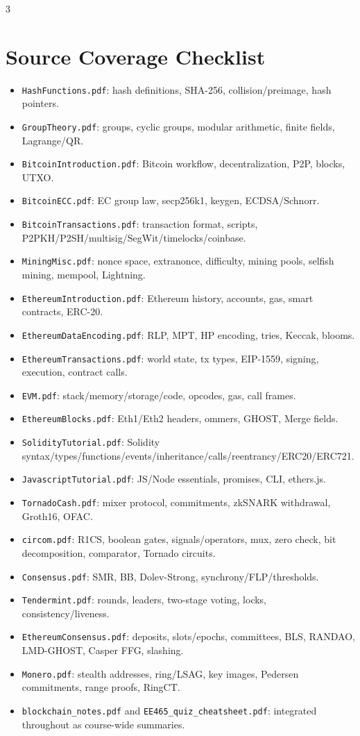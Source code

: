 \documentclass[8pt]{extarticle}
\begin{document}
\begin{multicols*}{3}
\section{Source Coverage Checklist}
\begin{itemize}
\item \texttt{HashFunctions.pdf}: hash definitions, SHA-256, collision/preimage, hash pointers.
\item \texttt{GroupTheory.pdf}: groups, cyclic groups, modular arithmetic, finite fields, Lagrange/QR.
\item \texttt{BitcoinIntroduction.pdf}: Bitcoin workflow, decentralization, P2P, blocks, UTXO.
\item \texttt{BitcoinECC.pdf}: EC group law, secp256k1, keygen, ECDSA/Schnorr.
\item \texttt{BitcoinTransactions.pdf}: transaction format, scripts, P2PKH/P2SH/multisig/SegWit/timelocks/coinbase.
\item \texttt{MiningMisc.pdf}: nonce space, extranonce, difficulty, mining pools, selfish mining, mempool, Lightning.
\item \texttt{EthereumIntroduction.pdf}: Ethereum history, accounts, gas, smart contracts, ERC-20.
\item \texttt{EthereumDataEncoding.pdf}: RLP, MPT, HP encoding, tries, Keccak, blooms.
\item \texttt{EthereumTransactions.pdf}: world state, tx types, EIP-1559, signing, execution, contract calls.
\item \texttt{EVM.pdf}: stack/memory/storage/code, opcodes, gas, call frames.
\item \texttt{EthereumBlocks.pdf}: Eth1/Eth2 headers, ommers, GHOST, Merge fields.
\item \texttt{SolidityTutorial.pdf}: Solidity syntax/types/functions/events/inheritance/calls/reentrancy/ERC20/ERC721.
\item \texttt{JavascriptTutorial.pdf}: JS/Node essentials, promises, CLI, ethers.js.
\item \texttt{TornadoCash.pdf}: mixer protocol, commitments, zkSNARK withdrawal, Groth16, OFAC.
\item \texttt{circom.pdf}: R1CS, boolean gates, signals/operators, mux, zero check, bit decomposition, comparator, Tornado circuits.
\item \texttt{Consensus.pdf}: SMR, BB, Dolev-Strong, synchrony/FLP/thresholds.
\item \texttt{Tendermint.pdf}: rounds, leaders, two-stage voting, locks, consistency/liveness.
\item \texttt{EthereumConsensus.pdf}: deposits, slots/epochs, committees, BLS, RANDAO, LMD-GHOST, Casper FFG, slashing.
\item \texttt{Monero.pdf}: stealth addresses, ring/LSAG, key images, Pedersen commitments, range proofs, RingCT.
\item \texttt{blockchain\_notes.pdf} and \texttt{EE465\_quiz\_cheatsheet.pdf}: integrated throughout as course-wide summaries.
\end{itemize}

\end{multicols*}
\end{document}
